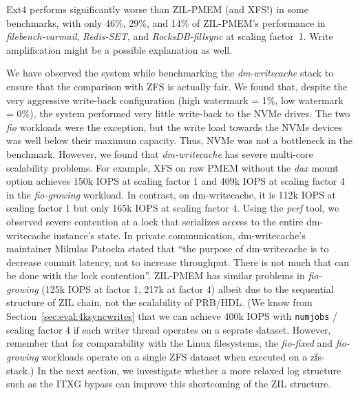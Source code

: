 \documentclass[12pt,a4paper,twoside]{book}
\begin{document}
Ext4 performs significantly worse than ZIL-PMEM (and XFS!) in some benchmarks, with only 46\%, 29\%, and 14\% of ZIL-PMEM's performance in \textit{filebench-varmail}, \textit{Redis-SET}, and \textit{RocksDB-fillsync} at scaling factor~1.
Write amplification might be a possible explanation as well.

We have observed the system while benchmarking the \textit{dm-writecache} stack to ensure that the comparison with ZFS is actually fair.
We found that, despite the very aggressive write-back configuration (high watermark = 1\%, low watermark = 0\%), the system performed very little write-back to the NVMe drives.
The two \textit{fio} workloads were the exception, but the write load towards the NVMe devices was well below their maximum capacity.
Thus, NVMe was not a bottleneck in the benchmark.
However, we found that \textit{dm-writecache} has severe multi-core scalability problems.
For example, XFS on raw PMEM without the \textit{dax} mount option achieves 150k IOPS at scaling factor 1 and 409k IOPS at scaling factor 4 in the \textit{fio-growing} workload.
In contrast, on dm-writecache, it is 112k IOPS at scaling factor 1 but only 165k IOPS at scaling factor 4.
Using the \textit{perf} tool, we observed severe contention at a lock that serializes access to the entire dm-writecache instance's state.
In private communication, dm-writecache's maintainer Mikulas Patocka stated that ``the purpose of dm-writecache is to decrease commit latency, not to increase throughput. There is not much that can be done with the lock contention''.
ZIL-PMEM has similar problems in \textit{fio-growing} (125k IOPS at factor 1, 217k at factor 4) albeit due to the sequential structure of ZIL chain, not the scalability of PRB/HDL.
(We know from Section~\ref{sec:eval:4ksyncwrites} that we can achieve 400k IOPS with \lstinline{numjobs} / scaling factor 4 if each writer thread operates on a seprate dataset.
 However, remember that for comparability with the Linux filesystems, the \textit{fio-fixed} and \textit{fio-growing} workloads operate on a single ZFS dataset when executed on a zfs-\* stack.)
In the next section, we investigate whether a more relaxed log structure such as the ITXG bypass can improve this shortcoming of the ZIL structure.

\end{document}
